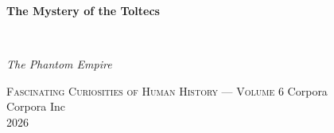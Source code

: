 \clearpage
\vspace*{1.5in}
\begin{center}
  \begin{minipage}{\textwidth}
    \centering
    \Huge\bfseries
    \linespread{1.25}\selectfont
    The Mystery of the Toltecs
  \end{minipage}
  \\[3em]
  {\Large\itshape\linespread{1.3}\selectfont
  The Phantom Empire\par}
  \vspace{2em}
  {\small\scshape Fascinating Curiosities of Human History — Volume 6}
  \vfill
  {\large Corpora}
  \\[1em]
  {\large Corpora Inc}
  \\[1em]
  {\large 2026}
\end{center}
\clearpage
